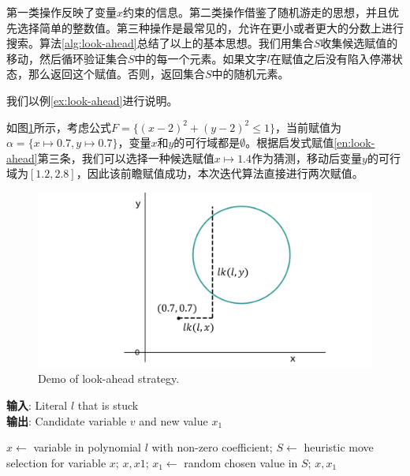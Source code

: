 第一类操作反映了变量$x$约束的信息。第二类操作借鉴了随机游走的思想，并且优先选择简单的整数值。第三种操作是最常见的，允许在更小或者更大的分数上进行搜索。算法\ref{alg:look-ahead}总结了以上的基本思想。我们用集合$S$收集候选赋值的移动，然后循环验证集合$S$中的每一个元素。如果文字$l$在赋值之后没有陷入停滞状态，那么返回这个赋值。否则，返回集合$S$中的随机元素。

我们以例\ref{ex:look-ahead}进行说明。

\begin{example}
如图\ref{fig:look-ahead}所示，考虑公式$F = \{(x - 2)^2 + (y - 2)^2 \leq 1\}$，当前赋值为$\alpha = \{x \mapsto 0.7, y \mapsto 0.7\}$，变量$x$和$y$的可行域都是$\emptyset$。根据启发式赋值\ref{en:look-ahead}第三条，我们可以选择一种候选赋值$x \mapsto 1.4$作为猜测，移动后变量$y$的可行域为$[1.2, 2.8]$，因此该前瞻赋值成功，本次迭代算法直接进行两次赋值。

\begin{figure}[t]
    \centering
    \includegraphics[width=0.7\columnwidth]{Img/look-ahead.png}
     {Demo of look-ahead strategy.}
\label{fig:look-ahead}
\end{figure}
\label{ex:look-ahead}
\end{example}

\begin{algorithm}[t]
    \caption{Heuristic choice of candidate values and look-ahead for critical moves}
    \label{alg:look-ahead}
    \textbf{输入}: Literal $l$ that is stuck\\
    \textbf{输出}: Candidate variable $v$ and new value $x_1$
    
    \begin{algorithmic}[1] %
        \Statex \hrulefill
        \STATE $x \leftarrow$ variable in polynomial  $l$ with non-zero coefficient;
        \STATE $S \leftarrow$ heuristic move selection for variable $x$;
                \RETURN $x, x1$;
            \ENDIF
        \ENDFOR
        \STATE $x_1 \leftarrow$ random chosen value in $S$;
        \STATE \RETURN $x, x_1$
    \end{algorithmic}
\end{algorithm}

